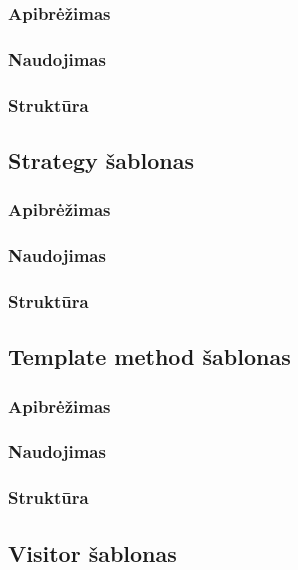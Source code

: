 \documentclass[10pt]{IEEEtran}
\begin{document}
			\subsubsection{Apibrėžimas}

			\subsubsection{Naudojimas}

			\subsubsection{Struktūra}


		\subsection{Strategy šablonas}

			\subsubsection{Apibrėžimas}

			\subsubsection{Naudojimas}

			\subsubsection{Struktūra}

		
		\subsection{Template method šablonas}

			\subsubsection{Apibrėžimas}

			\subsubsection{Naudojimas}

			\subsubsection{Struktūra}

		\subsection{Visitor šablonas}
\end{document}
